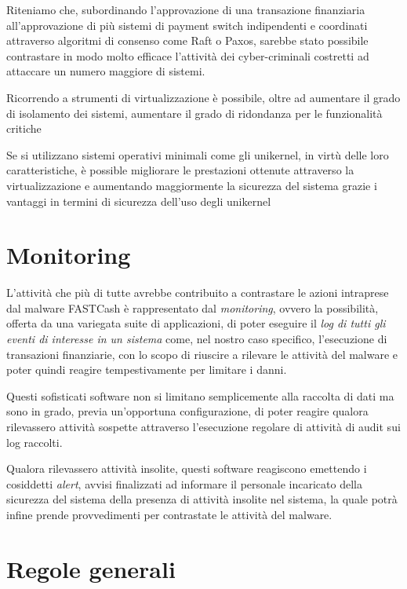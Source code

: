 \documentclass[10pt,a4paper, titlepage]{report}
\begin{document}
Riteniamo che, subordinando l'approvazione di una transazione finanziaria all'approvazione di più sistemi di payment switch indipendenti e coordinati attraverso algoritmi di consenso come Raft o Paxos, sarebbe stato possibile contrastare in modo molto efficace l'attività dei cyber-criminali costretti ad attaccare un numero maggiore di sistemi. 

Ricorrendo a strumenti di virtualizzazione è possibile, oltre ad aumentare il grado di isolamento dei sistemi, aumentare il grado di ridondanza per le funzionalità critiche

Se si utilizzano sistemi operativi minimali come gli unikernel, in virtù delle loro caratteristiche, è possible migliorare le prestazioni ottenute attraverso la virtualizzazione e aumentando maggiormente la sicurezza del sistema grazie i vantaggi in termini di sicurezza dell'uso degli unikernel

\section{Monitoring}

L'attività che più di tutte avrebbe contribuito a contrastare le azioni intraprese dal malware FASTCash è rappresentato dal \textit{monitoring}, ovvero la possibilità, offerta da una variegata suite di applicazioni, di poter eseguire il \textit{log di tutti gli eventi di interesse in un sistema} come, nel nostro caso specifico, l'esecuzione di transazioni finanziarie, con lo scopo di riuscire a rilevare le attività del malware e poter quindi reagire tempestivamente per limitare i danni.

Questi sofisticati software non si limitano semplicemente alla raccolta di dati ma sono in grado, previa un'opportuna configurazione, di poter reagire qualora rilevassero attività sospette attraverso l'esecuzione regolare di attività di audit sui log raccolti. 

Qualora rilevassero attività insolite, questi software reagiscono emettendo i cosiddetti \textit{alert}, avvisi finalizzati ad informare il personale incaricato della sicurezza del sistema della presenza di attività insolite nel sistema, la quale potrà infine prende provvedimenti per contrastate le attività del malware.  

\section{Regole generali}

\listoftables
\lstlistoflistings
\end{document}
